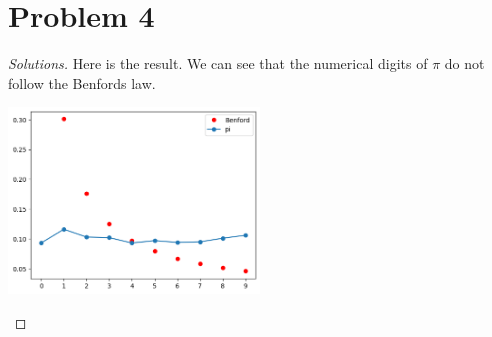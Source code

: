 \section*{Problem 4}
	\begin{proof} [Solutions]
		Here is the result. We can see that the numerical digits of $\pi$ do not follow the Benford\textquotesingle s law.
		\begin{center}
			\includegraphics[width=0.5\textwidth]{pi.png}
		\end{center}
	\end{proof}